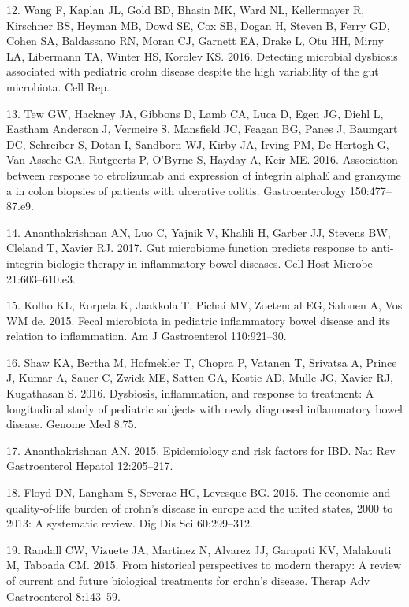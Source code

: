 \documentclass[12pt,]{article}
\begin{document}
\hypertarget{ref-wang_pedsCD_2016}{}
12. Wang F, Kaplan JL, Gold BD, Bhasin MK, Ward NL, Kellermayer R,
Kirschner BS, Heyman MB, Dowd SE, Cox SB, Dogan H, Steven B, Ferry GD,
Cohen SA, Baldassano RN, Moran CJ, Garnett EA, Drake L, Otu HH, Mirny
LA, Libermann TA, Winter HS, Korolev KS. 2016. Detecting microbial
dysbiosis associated with pediatric crohn disease despite the high
variability of the gut microbiota. Cell Rep.

\hypertarget{ref-Tew2016_UC}{}
13. Tew GW, Hackney JA, Gibbons D, Lamb CA, Luca D, Egen JG, Diehl L,
Eastham Anderson J, Vermeire S, Mansfield JC, Feagan BG, Panes J,
Baumgart DC, Schreiber S, Dotan I, Sandborn WJ, Kirby JA, Irving PM, De
Hertogh G, Van Assche GA, Rutgeerts P, O'Byrne S, Hayday A, Keir ME.
2016. Association between response to etrolizumab and expression of
integrin alphaE and granzyme a in colon biopsies of patients with
ulcerative colitis. Gastroenterology 150:477--87.e9.

\hypertarget{ref-Ananthakrishnan_IBD_2017}{}
14. Ananthakrishnan AN, Luo C, Yajnik V, Khalili H, Garber JJ, Stevens
BW, Cleland T, Xavier RJ. 2017. Gut microbiome function predicts
response to anti-integrin biologic therapy in inflammatory bowel
diseases. Cell Host Microbe 21:603--610.e3.

\hypertarget{ref-Kolho2015_pedIBD}{}
15. Kolho KL, Korpela K, Jaakkola T, Pichai MV, Zoetendal EG, Salonen A,
Vos WM de. 2015. Fecal microbiota in pediatric inflammatory bowel
disease and its relation to inflammation. Am J Gastroenterol
110:921--30.

\hypertarget{ref-Shaw_response_2016}{}
16. Shaw KA, Bertha M, Hofmekler T, Chopra P, Vatanen T, Srivatsa A,
Prince J, Kumar A, Sauer C, Zwick ME, Satten GA, Kostic AD, Mulle JG,
Xavier RJ, Kugathasan S. 2016. Dysbiosis, inflammation, and response to
treatment: A longitudinal study of pediatric subjects with newly
diagnosed inflammatory bowel disease. Genome Med 8:75.

\hypertarget{ref-ananthakrishnan_epidemiology_2015}{}
17. Ananthakrishnan AN. 2015. Epidemiology and risk factors for IBD. Nat
Rev Gastroenterol Hepatol 12:205--217.

\hypertarget{ref-floyd_economicburden_2015}{}
18. Floyd DN, Langham S, Severac HC, Levesque BG. 2015. The economic and
quality-of-life burden of crohn's disease in europe and the united
states, 2000 to 2013: A systematic review. Dig Dis Sci 60:299--312.

\hypertarget{ref-randall_CDbiologics_2015}{}
19. Randall CW, Vizuete JA, Martinez N, Alvarez JJ, Garapati KV,
Malakouti M, Taboada CM. 2015. From historical perspectives to modern
therapy: A review of current and future biological treatments for
crohn's disease. Therap Adv Gastroenterol 8:143--59.
\end{document}
